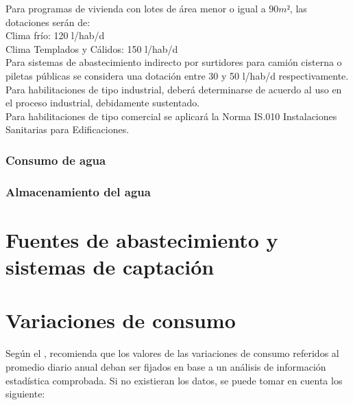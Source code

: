             Para programas de vivienda con lotes de área menor o igual a $90m²$, las dotaciones serán de:\\ 
            Clima frío: 120 l/hab/d \\ Clima Templados y Cálidos: 150 l/hab/d \\ 
            
            Para sistemas de abastecimiento indirecto por surtidores para camión cisterna o piletas públicas se considera una dotación entre 30 y 50 l/hab/d respectivamente.\\ 

            Para habilitaciones de tipo industrial, deberá determinarse de acuerdo al uso en el proceso industrial, debidamente sustentado.\\ 

            Para habilitaciones de tipo comercial se aplicará la Norma IS.010 Instalaciones Sanitarias para Edificaciones.
        \subsubsection{Consumo de agua}
            
        \subsubsection{Almacenamiento del agua}
            
    \section{Fuentes de abastecimiento y sistemas de captación}
    \section{Variaciones de consumo}
        Según el \textcite{os100}, recomienda que los valores de las variaciones de consumo referidos al promedio diario anual deban ser fijados en base a un análisis de información estadística comprobada. Si no existieran los datos, se puede tomar en cuenta los siguiente:
